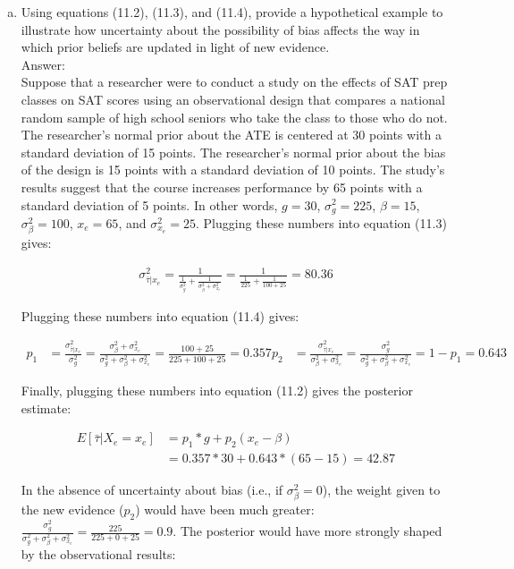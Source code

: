 \documentclass[11pt,notitlepage]{article}\usepackage[]{graphicx}\usepackage[]{color}
\begin{document}
\begin{enumerate}[a)]
\item Using equations (11.2), (11.3), and (11.4), provide a hypothetical example to illustrate how uncertainty about the possibility of bias affects the way in which prior beliefs are updated in light of new evidence.\\
Answer:\\
Suppose that a researcher were to conduct a study on the effects of SAT prep classes on SAT scores using an observational design that compares a national random sample of high school seniors who take the class to those who do not. The researcher's normal prior about the ATE is centered at 30 points with a standard deviation of 15 points. The researcher's normal prior about the bias of the design is 15 points with a standard deviation of 10 points. The study's results suggest that the course increases performance by 65 points with a standard deviation of 5 points. In other words, $g=30$, $\sigma^2_g = 225$, $\beta = 15$, $\sigma^2_{\beta} = 100$, $x_e = 65$, and $\sigma^2_{x_e} = 25$. Plugging these numbers into equation (11.3) gives: 

\begin{align*}
\sigma^2_{\bar{\tau}|x_e} = \frac{1}{\frac{1}{\sigma^2_g} + \frac{1}{\sigma^2_{\beta} + \sigma^2_{x_e}}} = \frac{1}{\frac{1}{225} + \frac{1}{100+25}} = 80.36
\end{align*}

Plugging these numbers into equation (11.4) gives: 

\begin{align*}
p_1 &= \frac{\sigma^2_{\bar{\tau}|x_e}}{\sigma^2_g} = \frac{\sigma^2_{\beta} + \sigma^2_{x_e}}{\sigma^2_g +\sigma^2_{\beta} + \sigma^2_{x_e}} = \frac{100+25}{225+100+25} = 0.357
p_2 &= \frac{\sigma^2_{\bar{\tau}|x_e}}{\sigma^2_{\beta} + \sigma^2_{x_e}} = \frac{\sigma^2_g}{\sigma^2_g +\sigma^2_{\beta} + \sigma^2_{x_e}} = 1 - p_1 = 0.643
\end{align*}

Finally, plugging these numbers into equation (11.2) gives the posterior estimate:

\begin{align*}
E[\bar{\tau}|X_e = x_e] &= p_1*g + p_2(x_e - \beta) \\
&= 0.357 * 30 + 0.643*(65-15) = 42.87
\end{align*}

In the absence of uncertainty about bias (i.e., if $\sigma^2_{\beta}=0$), the weight given to the new evidence ($p_2$) would have been much greater: $\frac{\sigma^2_g}{\sigma^2_g +\sigma^2_{\beta} + \sigma^2_{x_e}} = \frac{225}{225 + 0 +25} = 0.9$.  The posterior would have more strongly shaped by the observational results:


\end{enumerate}
\end{document}
